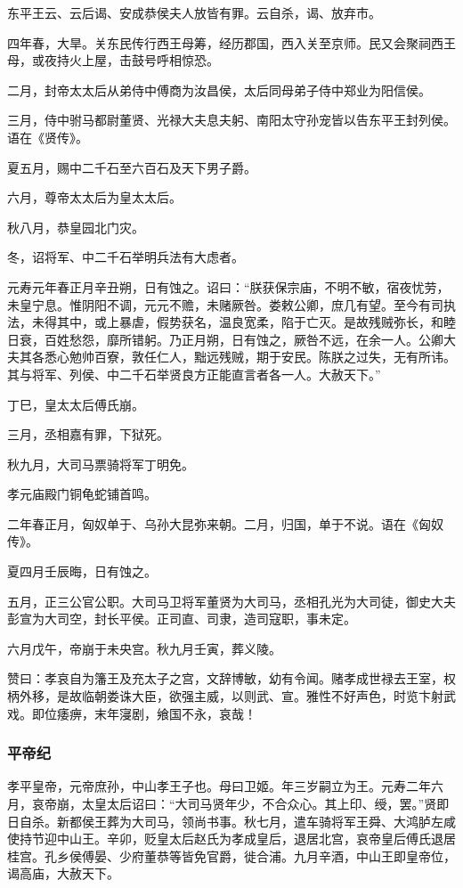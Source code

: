 \documentclass[]{article}
\begin{document}
东平王云、云后谒、安成恭侯夫人放皆有罪。云自杀，谒、放弃市。

四年春，大旱。关东民传行西王母筹，经历郡国，西入关至京师。民又会聚祠西王母，或夜持火上屋，击鼓号呼相惊恐。

二月，封帝太太后从弟侍中傅商为汝昌侯，太后同母弟子侍中郑业为阳信侯。

三月，侍中驸马都尉董贤、光禄大夫息夫躬、南阳太守孙宠皆以告东平王封列侯。语在《贤传》。

夏五月，赐中二千石至六百石及天下男子爵。

六月，尊帝太太后为皇太太后。

秋八月，恭皇园北门灾。

冬，诏将军、中二千石举明兵法有大虑者。

元寿元年春正月辛丑朔，日有蚀之。诏曰：``朕获保宗庙，不明不敏，宿夜忧劳，未皇宁息。惟阴阳不调，元元不赡，未赌厥咎。娄敕公卿，庶几有望。至今有司执法，未得其中，或上暴虐，假势获名，温良宽柔，陷于亡灭。是故残贼弥长，和睦日衰，百姓愁怨，靡所错躬。乃正月朔，日有蚀之，厥咎不远，在余一人。公卿大夫其各悉心勉帅百寮，敦任仁人，黜远残贼，期于安民。陈朕之过失，无有所讳。其与将军、列侯、中二千石举贤良方正能直言者各一人。大赦天下。''

丁巳，皇太太后傅氏崩。

三月，丞相嘉有罪，下狱死。

秋九月，大司马票骑将军丁明免。

孝元庙殿门铜龟蛇铺首鸣。

二年春正月，匈奴单于、乌孙大昆弥来朝。二月，归国，单于不说。语在《匈奴传》。

夏四月壬辰晦，日有蚀之。

五月，正三公官公职。大司马卫将军董贤为大司马，丞相孔光为大司徒，御史大夫彭宣为大司空，封长平侯。正司直、司隶，造司寇职，事未定。

六月戊午，帝崩于未央宫。秋九月壬寅，葬义陵。

赞曰：孝哀自为籓王及充太子之宫，文辞博敏，幼有令闻。赌孝成世禄去王室，权柄外移，是故临朝娄诛大臣，欲强主威，以则武、宣。雅性不好声色，时览卞射武戏。即位痿痹，末年寖剧，飨国不永，哀哉！

\hypertarget{header-n1156}{%
\subsubsection{平帝纪}\label{header-n1156}}

孝平皇帝，元帝庶孙，中山孝王子也。母曰卫姬。年三岁嗣立为王。元寿二年六月，哀帝崩，太皇太后诏曰：``大司马贤年少，不合众心。其上印、绶，罢。''贤即日自杀。新都侯王葬为大司马，领尚书事。秋七月，遣车骑将军王舜、大鸿胪左咸使持节迎中山王。辛卯，贬皇太后赵氏为孝成皇后，退居北宫，哀帝皇后傅氏退居桂宫。孔乡侯傅晏、少府董恭等皆免官爵，徙合浦。九月辛酒，中山王即皇帝位，谒高庙，大赦天下。
\end{document}
